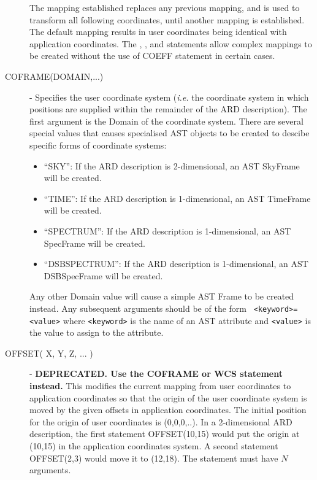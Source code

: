 \begin{description}
The mapping established replaces any previous mapping, and is used to transform
all following coordinates, until another mapping is established. The default
mapping results in user coordinates being identical with application
coordinates. The , ,  and  statements allow complex
mappings to be created without the use of COEFF statement in certain cases. 

\item [\label{ST:COFRAME}COFRAME(DOMAIN,...)] - Specifies the user
coordinate system ({\em i.e.} the coordinate system in which positions
are supplied within the remainder of the ARD description). The first
argument is the Domain of the coordinate system. There are several
special values that causes specialised AST objects to be created to
descibe specific forms of coordinate systems:

\begin{itemize}
\item ``SKY'': If the ARD description is 2-dimensional, an AST SkyFrame will 
be created.
\item ``TIME'': If the ARD description is 1-dimensional, an AST TimeFrame will 
be created.
\item ``SPECTRUM'': If the ARD description is 1-dimensional, an AST SpecFrame 
will be created.
\item ``DSBSPECTRUM'': If the ARD description is 1-dimensional, an AST DSBSpecFrame 
will be created.
\end{itemize}

Any other Domain value will cause a simple AST Frame to be created
instead. Any subsequent arguments should be of the form {\tt
<keyword>=<value>} where {\tt <keyword>} is the name of an AST attribute
and {\tt <value>} is the value to assign to the attribute.

\item [\label{ST:OFF}OFFSET( X, Y, Z, ... )] - {\bf DEPRECATED. Use the COFRAME or WCS statement instead.} This modifies the current mapping
from user coordinates to application coordinates so that the origin of the
user coordinate system is moved by the given offsets in application
coordinates. The initial position for the origin of user coordinates is
(0,0,0,..). In a 2-dimensional ARD description, the first statement OFFSET(10,15)
would put the origin at (10,15) in the application coordinates system. A second
statement OFFSET(2,3) would move it to (12,18). The statement must have $N$ 
arguments.


\end{description}
